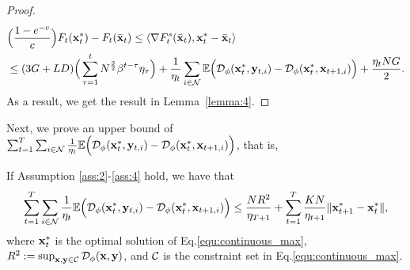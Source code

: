 \begin{proof}
		\begin{equation*}
			\begin{aligned}
				&\Big(\frac{1-e^{-c}}{c}\Big)F_{t}(\mathbf{x}^{*}_{t})-F_{t}(\bar{\mathbf{x}}_{t})\le\langle\nabla F_{t}^{s}(\bar{\mathbf{x}}_{t}),\mathbf{x}^{*}_{t}-\bar{\mathbf{x}}_{t}\rangle\\
				&\le(3G+LD)\Big(\sum_{\tau=1}^{t}N^{\frac{3}{2}}\beta^{t-\tau}\eta_{\tau}\Big)+\frac{1}{\eta_{t}}\sum_{i\in\mathcal{N}}\mathbb{E}\Big(\mathcal{D}_{\phi}(\mathbf{x}^{*}_{t},\mathbf{y}_{t,i})-\mathcal{D}_{\phi}(\mathbf{x}^{*}_{t},\mathbf{x}_{t+1,i})\Big)+\frac{\eta_{t}NG}{2}.		
			\end{aligned}
		\end{equation*}
As a result, we get the result in Lemma~\ref{lemma:4}.
	\end{proof}
	Next, we prove an upper bound of $\sum_{t=1}^{T}\sum_{i\in\mathcal{N}}\frac{1}{\eta_{t}}\mathbb{E}\Big(\mathcal{D}_{\phi}(\mathbf{x}^{*}_{t},\mathbf{y}_{t,i})-\mathcal{D}_{\phi}(\mathbf{x}^{*}_{t},\mathbf{x}_{t+1,i})\Big)$, that is, 
	\begin{lemma}\label{lemma:5} If Assumption \ref{ass:2}-\ref{ass:4} hold, we have that
		\begin{equation*}
		\sum_{t=1}^{T}\sum_{i\in\mathcal{N}}\frac{1}{\eta_{t}}\mathbb{E}\Big(\mathcal{D}_{\phi}(\mathbf{x}^{*}_{t},\mathbf{y}_{t,i})-\mathcal{D}_{\phi}(\mathbf{x}^{*}_{t},\mathbf{x}_{t+1,i})\Big)\le\frac{NR^{2}}{\eta_{T+1}}+\sum_{t=1}^{T}\frac{KN} {\eta_{t+1}}\|\mathbf{x}^{*}_{t+1}-\mathbf{x}^{*}_{t}\|,
		\end{equation*} where $\mathbf{x}_{t}^{*}$ is the optimal solution of Eq.\eqref{equ:continuous_max}, $R^{2}:=\sup_{\mathbf{x},\mathbf{y}\in\mathcal{C}}\mathcal{D}_{\phi}(\mathbf{x},\mathbf{y})$, and $\mathcal{C}$ is the constraint set in Eq.\eqref{equ:continuous_max}. 
	\end{lemma}
